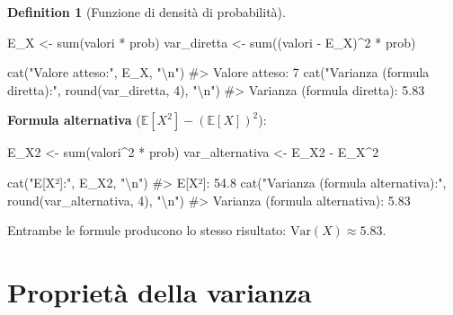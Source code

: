 \documentclass[
  letterpaper,
  DIV=11,
  numbers=noendperiod,
  oneside]{scrreprt}
\newenvironment{Shaded}{\begin{snugshade}}{\end{snugshade}}
\newcommand{\CommentTok}[1]{\textcolor[rgb]{0.37,0.37,0.37}{#1}}
\newcommand{\DecValTok}[1]{\textcolor[rgb]{0.68,0.00,0.00}{#1}}
\newcommand{\FunctionTok}[1]{\textcolor[rgb]{0.28,0.35,0.67}{#1}}
\newcommand{\NormalTok}[1]{\textcolor[rgb]{0.00,0.23,0.31}{#1}}
\newcommand{\OtherTok}[1]{\textcolor[rgb]{0.00,0.23,0.31}{#1}}
\newcommand{\SpecialCharTok}[1]{\textcolor[rgb]{0.37,0.37,0.37}{#1}}
\newcommand{\StringTok}[1]{\textcolor[rgb]{0.13,0.47,0.30}{#1}}
\theoremstyle{definition}
\theoremstyle{plain}
\theoremstyle{definition}
\newtheorem{definition}{Definition}[chapter]
\theoremstyle{remark}
\begin{document}
\begin{definition}[Funzione di densità di
probabilità]
\begin{tcolorbox}
\begin{Shaded}
\begin{Highlighting}[]
\NormalTok{E\_X }\OtherTok{\textless{}{-}} \FunctionTok{sum}\NormalTok{(valori }\SpecialCharTok{*}\NormalTok{ prob)}
\NormalTok{var\_diretta }\OtherTok{\textless{}{-}} \FunctionTok{sum}\NormalTok{((valori }\SpecialCharTok{{-}}\NormalTok{ E\_X)}\SpecialCharTok{\^{}}\DecValTok{2} \SpecialCharTok{*}\NormalTok{ prob)}

\FunctionTok{cat}\NormalTok{(}\StringTok{"Valore atteso:"}\NormalTok{, E\_X, }\StringTok{"}\SpecialCharTok{\textbackslash{}n}\StringTok{"}\NormalTok{)}
\CommentTok{\#\textgreater{} Valore atteso: 7}
\FunctionTok{cat}\NormalTok{(}\StringTok{"Varianza (formula diretta):"}\NormalTok{, }\FunctionTok{round}\NormalTok{(var\_diretta, }\DecValTok{4}\NormalTok{), }\StringTok{"}\SpecialCharTok{\textbackslash{}n}\StringTok{"}\NormalTok{)}
\CommentTok{\#\textgreater{} Varianza (formula diretta): 5.83}
\end{Highlighting}
\end{Shaded}

\textbf{Formula alternativa} (\(\mathbb{E}[X^2] - (\mathbb{E}[X])^2\)):

\begin{Shaded}
\begin{Highlighting}[]
\NormalTok{E\_X2 }\OtherTok{\textless{}{-}} \FunctionTok{sum}\NormalTok{(valori}\SpecialCharTok{\^{}}\DecValTok{2} \SpecialCharTok{*}\NormalTok{ prob)}
\NormalTok{var\_alternativa }\OtherTok{\textless{}{-}}\NormalTok{ E\_X2 }\SpecialCharTok{{-}}\NormalTok{ E\_X}\SpecialCharTok{\^{}}\DecValTok{2}

\FunctionTok{cat}\NormalTok{(}\StringTok{"E[X²]:"}\NormalTok{, E\_X2, }\StringTok{"}\SpecialCharTok{\textbackslash{}n}\StringTok{"}\NormalTok{)}
\CommentTok{\#\textgreater{} E[X²]: 54.8}
\FunctionTok{cat}\NormalTok{(}\StringTok{"Varianza (formula alternativa):"}\NormalTok{, }\FunctionTok{round}\NormalTok{(var\_alternativa, }\DecValTok{4}\NormalTok{), }\StringTok{"}\SpecialCharTok{\textbackslash{}n}\StringTok{"}\NormalTok{)}
\CommentTok{\#\textgreater{} Varianza (formula alternativa): 5.83}
\end{Highlighting}
\end{Shaded}

Entrambe le formule producono lo stesso risultato:
\(\text{Var}(X) \approx 5.83\).

\end{tcolorbox}

\section{Proprietà della varianza}\label{proprietuxe0-della-varianza}


\end{definition}
\end{document}
